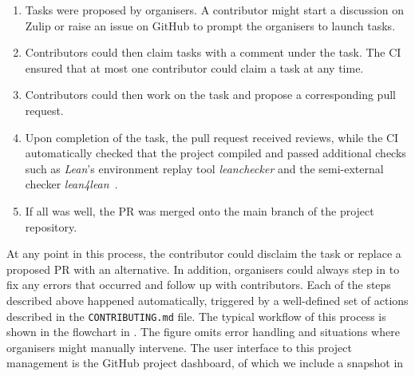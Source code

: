 \begin{enumerate}
    \item Tasks were proposed by organisers. A contributor might start a discussion on Zulip or raise an issue on GitHub to prompt the organisers to launch tasks.
    \item Contributors could then claim tasks with a comment under the task. The CI ensured that at most one contributor could claim a task at any time.
    \item Contributors could then work on the task and propose a corresponding pull request.
    \item Upon completion of the task, the pull request received reviews, while the CI automatically checked that the project compiled and passed additional checks such as \emph{Lean}'s environment replay tool \emph{leanchecker} and the semi-external checker \emph{lean4lean}~\cite{lean4lean}.
    \item If all was well, the PR was merged onto the main branch of the project repository.
\end{enumerate}

At any point in this process, the contributor could disclaim the task or replace a proposed PR with an alternative. In addition, organisers could always step in to fix any errors that occurred and follow up with contributors. Each of the steps described above happened automatically, triggered by a well-defined set of actions described in the \texttt{CONTRIBUTING.md} file. The typical workflow of this process is shown in the flowchart in . The figure omits error handling and situations where organisers might manually intervene. The user interface to this project management is the GitHub project dashboard, of which we include a snapshot in 

